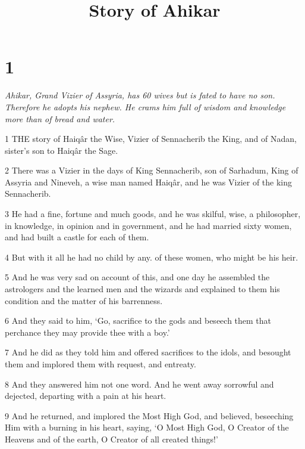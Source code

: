 

\title{Story of Ahikar}

\chapter{1}

\par \textit{Ahikar, Grand Vizier of Assyria, has 60 wives but is fated to have no son. Therefore he adopts his nephew. He crams him full of wisdom and knowledge more than of bread and water.}

\par 1 THE story of Haiqâr the Wise, Vizier of Sennacherib the King, and of Nadan, sister's son to Haiqâr the Sage.

\par 2 There was a Vizier in the days of King Sennacherib, son of Sarhadum, King of Assyria and Nineveh, a wise man named Haiqâr, and he was Vizier of the king Sennacherib.

\par 3 He had a fine, fortune and much goods, and he was skilful, wise, a philosopher, in knowledge, in opinion and in government, and he had married sixty women, and had built a castle for each of them.

\par 4 But with it all he had no child by any. of these women, who might be his heir.

\par 5 And he was very sad on account of this, and one day he assembled the astrologers and the learned men and the wizards and explained to them his condition and the matter of his barrenness.

\par 6 And they said to him, ‘Go, sacrifice to the gods and beseech them that perchance they may provide thee with a boy.’

\par 7 And he did as they told him and offered sacrifices to the idols, and besought them and implored them with request, and entreaty.

\par 8 And they answered him not one word. And he went away sorrowful and dejected, departing with a pain at his heart.

\par 9 And he returned, and implored the Most High God, and believed, beseeching Him with a burning in his heart, saying, ‘O Most High God, O Creator of the Heavens and of the earth, O Creator of all created things!’

